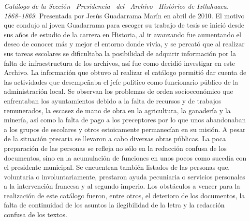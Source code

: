 \smallskip 
\noindent \textsl{Catálogo de la Sección \ Presidencia \ del \ 
Archivo \ Histórico de Ixtlahuaca. 1868--1869}. Presentada por Jesús 
Guadarrama Marín en abril de 2010. El motivo que condujo al joven 
Guadarrama para escoger su trabajo de tesis se inició desde sus años de 
estudio de la carrera en Historia, al ir avanzando fue aumentando el 
deseo de conocer más y mejor el entorno donde vivía, y se percató que al 
realizar sus tareas escolares se dificultaba la posibilidad de adquirir 
información por la falta de infraestructura de los archivos, así fue 
como decidió investigar en este Archivo. La información que obtuvo 
al realizar el catálogo permitió dar cuenta de las actividades que 
desempeñaba el jefe político como funcionario público de la 
administración local. Se observan los problemas de orden socioeconómico 
que enfrentaban los ayuntamientos debido a la falta de 
recursos y de trabajos remunerados, la escasez de mano de obra en la 
agricultura, la ganadería y la minería, así como la falta de pago a los 
preceptores por lo que unos abandonaban a los grupos de escolares y 
otros estoicamente permanecían en su  misión. A pesar de la situación 
precaria se llevaron a cabo diversas obras públicas. La poca 
preparación de las personas se refleja no sólo en la redacción confusa 
de los documentos, sino en la acumulación de funciones en unos pocos 
como sucedía con el presidente municipal. Se encuentran también 
listados de las personas que, voluntaria o involuntariamente, prestaron 
ayuda pecuniaria o servicios personales a la intervención francesa y al
segundo imperio. Los obstáculos a vencer para la realización de este 
catálogo fueron, entre otros, el deterioro de los documentos, la falta de 
continuidad de los asuntos la ilegibilidad de la letra y la redacción 
confusa de los textos.
\enlargethispage{\baselineskip}

